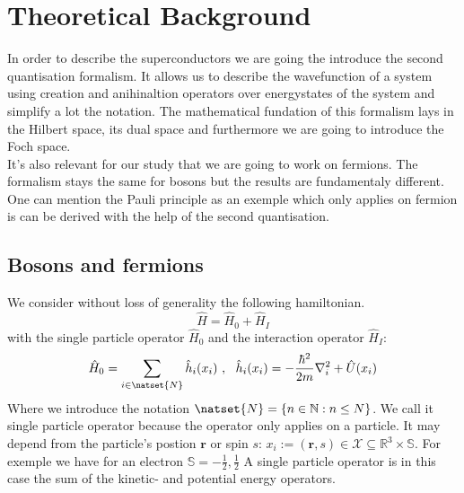 \documentclass[../main.tex]{subfile}
\begin{document}
 \normalsize
\section{Theoretical Background}
In order to describe the superconductors we are going the introduce the second quantisation formalism.
It allows us to describe the wavefunction of a system using creation and anihinaltion operators over
energystates of the system and simplify a lot the notation. The mathematical fundation of this formalism
lays in the Hilbert space, its dual space and furthermore we are going to introduce the Foch space.\\

It's also relevant for our study that we are going to work on fermions. The formalism stays the same for 
bosons but the results are fundamentaly different. One can mention the Pauli principle as an exemple which
only applies on fermion is can be derived with the help of the second quantisation.\\ 

\subsection{Bosons and fermions}
We consider without loss of generality the following hamiltonian. 
\[
    \hat{H} = \hat{H}_0 + \hat{H}_I
\]
with the single particle operator $\hat{H}_0$ and the interaction operator $\hat{H}_I$:
\[
    \hat{H}_0 = \sum_{i\in \natset{N}} \hat{h}_i(x_i)~,~~ \hat{h}_i(x_i) = -\frac{\hbar^2}{2m}\nabla_i^2 + \hat{U}(x_i)
\]
Where we introduce the notation $\natset{N} = \{n \in \mathbb{N}: n\leq N\}$. We call it single particle operator 
because the operator only applies on a particle. It may depend from the particle's postion $\bm{r}$ or spin $s$: 
$x_i := (\bm{r}, s) \in \mathcal{X}\subseteq\mathbb{R}^{3}\times\mathbb{S}$. For exemple we have for an electron 
$\mathbb{S}= {-\frac{1}{2},\frac{1}{2}}$ A single particle operator is in this case the sum of the kinetic- 
and potential energy operators.\\
\end{document}
